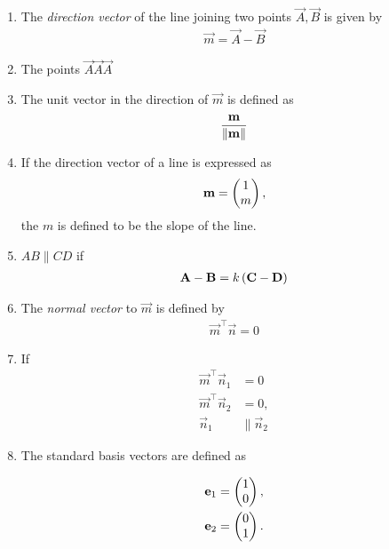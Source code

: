 \begin{enumerate}[label=\thesection.\arabic*.,ref=\thesection.\theenumi]
  \item The {\em direction vector} of the line joining two points $\vec{A},\vec{B}$ is given by 
  \begin{align}
    \label{eq:dir_vec}
    \vec{m} = \vec{A}-\vec{B}
  \end{align}
  \item The points $\vec{A}\vec{A}\vec{A}$
\item The unit vector in the direction of $\vec{m}$ is defined as
\begin{align}
    \frac{\mathbf{m}}{\left\lVert\mathbf{m}\right\rVert}
\end{align}
\item If the direction vector of a line is expressed as 
		\label{prop:two-dir-vec}
	\begin{align}
		\label{eq:two-dir-vec}
    \vec{m} = \myvec{1\\m},
\end{align}
 the $m$ is defined to be the {\em} slope of the line. 
  \item $AB \parallel CD$ if 
	  \label{prop:two-par-dir-vec}
  \begin{align}
	  \vec{A}- \vec{B}= k\brak{\vec{C}- \vec{D}}
	  \label{eq:two-par-dir-vec}
  \end{align}
  \item The {\em normal vector} to $\vec{m}$ is defined by 
  \begin{align}
    \label{eq:normal_vec}
    \vec{m}^{\top}  \vec{n} = 0
  \end{align}
  \item  If
	  \label{prop:two-orth-para}
\begin{align}
	\vec{m}^{\top}  \vec{n}_1 &= 0
	\\
	\vec{m}^{\top}  \vec{n}_2 &= 0,
	\\
	\vec{n}_1 &\parallel \vec{n}_2
	  \label{eq:two-orth-para}
\end{align}
\item  The standard basis vectors are defined as 
	\label{def:matrix-two}

  \begin{align}
  \mathbf{e}_1&= \begin{pmatrix}1\\0\end{pmatrix}, 
  \\
  \mathbf{e}_2&= \begin{pmatrix}0\\1\end{pmatrix}.
  \end{align}
\end{enumerate}
